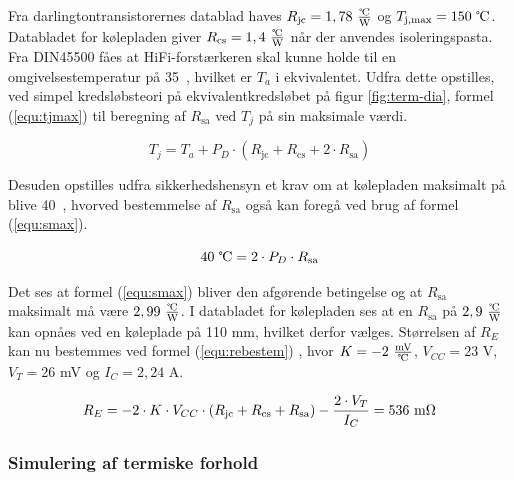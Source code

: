 Fra darlingtontransistorernes datablad haves $R_{\mathrm{jc}} = 1,78~\tfrac{\celsius}{\mathrm{W}}$ og $T_{\mathrm{j,max}} = 150~\celsius$. Databladet for kølepladen giver $R_{\mathrm{cs}} = 1,4~\tfrac{\celsius}{\mathrm{W}}$ når der anvendes isoleringspasta. Fra DIN45500 \cite{DIN45500} fåes at HiFi-forstærkeren skal kunne holde til en omgivelsestemperatur på 35~\celsius, hvilket er $T_a$ i ekvivalentet. Udfra dette opstilles, ved simpel kredsløbsteori på ekvivalentkredsløbet på figur \ref{fig:term-dia}, formel (\ref{equ:tjmax}) til beregning af $R_{\mathrm{sa}}$ ved $T_j$  på sin maksimale værdi. 

\begin{equation}
\label{equ:tjmax}
T_j = T_a + P_D \cdot (R_{\mathrm{jc}} + R_{\mathrm{cs}} + 2 \cdot R_{\mathrm{sa}})
\end{equation}

Desuden opstilles udfra sikkerhedshensyn et krav om at kølepladen maksimalt på blive 40~\celsius, hvorved bestemmelse af $R_{\mathrm{sa}}$ også kan foregå ved brug af formel (\ref{equ:smax}). 

\begin{equation}
\label{equ:smax}
40~\celsius = 2 \cdot P_D \cdot R_{\mathrm{sa}}
\end{equation}

Det ses at formel (\ref{equ:smax}) bliver den afgørende betingelse og at $R_{\mathrm{sa}}$ maksimalt må være $2,99~\tfrac{\celsius}{\mathrm{W}}$. I databladet for kølepladen ses at en $R_{\mathrm{sa}}$ på $2,9~\tfrac{\celsius}{\mathrm{W}}$ kan opnåes ved en køleplade på 110 mm, hvilket derfor vælges. Størrelsen af $R_E$ kan nu bestemmes ved formel (\ref{equ:rebestem}) \cite{ael-mm19} 
, hvor $K = - 2~\tfrac{\mathrm{mV}}{\celsius}$, $V_{CC} = 23$ V, $V_T = 26$ mV og $I_C = 2,24$ A.

\begin{equation}
\label{equ:rebestem}
R_E = - 2 \cdot K \cdot V_{CC} \cdot (R_{\mathrm{jc}} + R_{\mathrm{cs}} + R_{\mathrm{sa}}) - \frac{2 \cdot V_T}{I_C} = 536~\mathrm{m}\ohm
\end{equation}

\subsubsection*{Simulering af termiske forhold}


